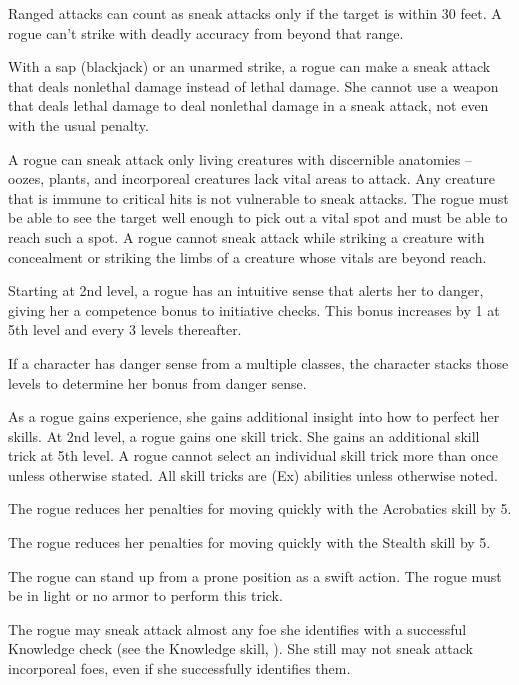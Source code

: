 \par Ranged attacks can count as sneak attacks only if the target is within 30 feet. A rogue can't strike with deadly accuracy from beyond that range.

With a sap (blackjack) or an unarmed strike, a rogue can make a sneak attack that deals nonlethal damage instead of lethal damage. She cannot use a weapon that deals lethal damage to deal nonlethal damage in a sneak attack, not even with the usual  penalty.

A rogue can sneak attack only living creatures with discernible anatomies -- oozes, plants, and incorporeal creatures lack vital areas to attack. Any creature that is immune to critical hits is not vulnerable to sneak attacks. The rogue must be able to see the target well enough to pick out a vital spot and must be able to reach such a spot. A rogue cannot sneak attack while striking a creature with concealment or striking the limbs of a creature whose vitals are beyond reach.

 Starting at 2nd level, a rogue has an intuitive sense that alerts her to danger, giving her a  competence bonus to initiative checks. This bonus increases by 1 at 5th level and every 3 levels thereafter.
\par If a character has danger sense from a multiple classes, the character stacks those levels to determine her bonus from danger sense.

 As a rogue gains experience, she gains additional insight into how to perfect her skills. At 2nd level, a rogue gains one skill trick. She gains an additional skill trick at 5th level. A rogue cannot select an individual skill trick more than once unless otherwise stated. All skill tricks are (Ex) abilities unless otherwise noted.

 The rogue reduces her penalties for moving quickly with the Acrobatics skill by 5.

 The rogue reduces her penalties for moving quickly with the Stealth skill by 5.

 The rogue can stand up from a prone position as a swift action. The rogue must be in light or no armor to perform this trick.

 The rogue may sneak attack almost any foe she identifies with a successful Knowledge check (see the Knowledge skill, ). She still may not sneak attack incorporeal foes, even if she successfully identifies them.

